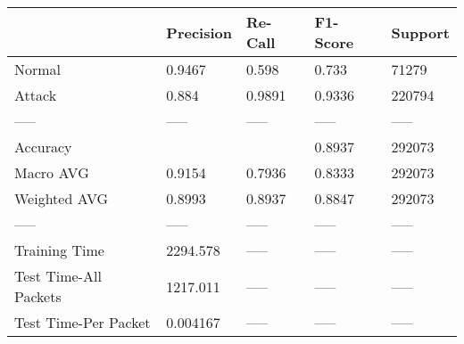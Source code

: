 \begin{tabular}{lllll}
\toprule
{} & Precision & Re-Call & F1-Score & Support \\
\midrule
Normal                &    0.9467 &   0.598 &    0.733 &   71279 \\
Attack                &     0.884 &  0.9891 &   0.9336 &  220794 \\
-----                 &     ----- &   ----- &    ----- &   ----- \\
Accuracy              &           &         &   0.8937 &  292073 \\
Macro AVG             &    0.9154 &  0.7936 &   0.8333 &  292073 \\
Weighted AVG          &    0.8993 &  0.8937 &   0.8847 &  292073 \\
-----                 &     ----- &   ----- &    ----- &   ----- \\
Training Time         &  2294.578 &   ----- &    ----- &   ----- \\
Test Time-All Packets &  1217.011 &   ----- &    ----- &   ----- \\
Test Time-Per Packet  &  0.004167 &   ----- &    ----- &   ----- \\
\bottomrule
\end{tabular}
